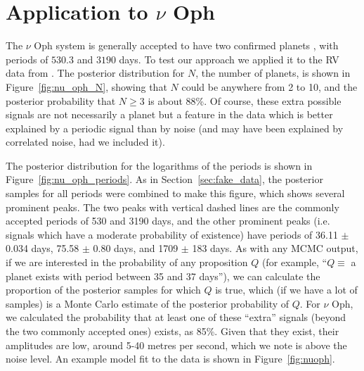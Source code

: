 \documentclass[useAMS,usenatbib]{mn2e}
\begin{document}
\section{Application to $\nu$ Oph}\label{sec:nu_oph}
The $\nu$ Oph system is generally accepted to have two confirmed planets
\citep[e.g.][]{2011AIPC.1331..102Q, 2012PASJ...64..135S, fengji}, with periods
of $530.3$ and $3190$ days. To test our approach we applied it to the RV
data from \citet{2012PASJ...64..135S}.
The posterior distribution for $N$, the number of planets, is shown in
Figure~\ref{fig:nu_oph_N}, showing that $N$ could be anywhere from 2 to 10,
and the posterior probability that $N \geq 3$ is about 88\%. Of course, these
extra possible signals are not necessarily a planet but a feature in the data
which is better explained by a periodic signal than by noise (and may have been
explained by correlated noise, had we included it).

The posterior distribution for the logarithms of the periods is shown in
Figure~\ref{fig:nu_oph_periods}. As in Section~\ref{sec:fake_data},
the posterior samples for all periods were combined to make this figure, which
shows several prominent peaks. 
The two peaks with vertical dashed lines are the commonly accepted periods of
530 and 3190 days, and the other prominent peaks (i.e. signals which have a
moderate probability of existence) have periods of 36.11 $\pm$ 0.034 days,
75.58 $\pm$ 0.80 days, and 1709 $\pm$ 183 days. As with any MCMC output,
if we are interested in the probability of any proposition $Q$ (for example,
``$Q \equiv$ a planet exists with period between 35 and 37 days''), we can
calculate the proportion of the posterior samples for which $Q$ is true, which
(if we have a lot of samples) is a Monte Carlo estimate of the posterior
probability of $Q$. For $\nu$ Oph, we calculated the probability that
at least one of these ``extra'' signals (beyond the two commonly accepted ones)
exists, as 85\%.
Given that they exist, their amplitudes are low, around 5-40 metres per second,
which we note is above the noise level. An example model fit to the data is
shown in Figure~\ref{fig:nuoph}.
\end{document}
